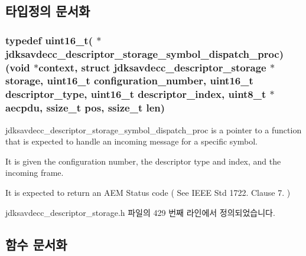\subsection{타입정의 문서화}
\subsubsection[{\texorpdfstring{jdksavdecc\+\_\+descriptor\+\_\+storage\+\_\+symbol\+\_\+dispatch\+\_\+proc}{jdksavdecc_descriptor_storage_symbol_dispatch_proc}}]{\setlength{\rightskip}{0pt plus 5cm}typedef uint16\+\_\+t( $\ast$ jdksavdecc\+\_\+descriptor\+\_\+storage\+\_\+symbol\+\_\+dispatch\+\_\+proc) (void $\ast$context, struct {\bf jdksavdecc\+\_\+descriptor\+\_\+storage} $\ast$storage, uint16\+\_\+t configuration\+\_\+number, uint16\+\_\+t descriptor\+\_\+type, uint16\+\_\+t descriptor\+\_\+index, {\bf uint8\+\_\+t} $\ast$aecpdu, ssize\+\_\+t pos, ssize\+\_\+t len)}\hypertarget{group__jdksavdecc__descriptor__storage__symbol__dispatch_gaf1c817a8f34d849b268537e6093c69aa}{}\label{group__jdksavdecc__descriptor__storage__symbol__dispatch_gaf1c817a8f34d849b268537e6093c69aa}
jdksavdecc\+\_\+descriptor\+\_\+storage\+\_\+symbol\+\_\+dispatch\+\_\+proc is a pointer to a function that is expected to handle an incoming message for a specific symbol.

It is given the configuration number, the descriptor type and index, and the incoming frame.

It is expected to return an A\+EM Status code ( See I\+E\+EE Std 1722. Clause 7. ) 

jdksavdecc\+\_\+descriptor\+\_\+storage.\+h 파일의 429 번째 라인에서 정의되었습니다.



\subsection{함수 문서화}
